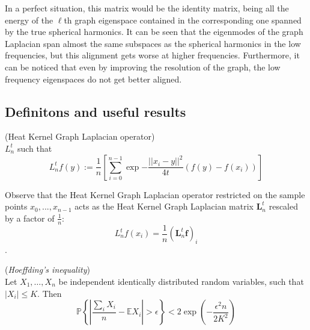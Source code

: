 In a perfect situation, this matrix would be the identity matrix, being all the energy of the $\ell$th graph eigenspace contained in the corresponding one spanned by the true spherical harmonics. It can be seen that the eigenmodes of the graph Laplacian span almost the same subspaces as the spherical harmonics in the low frequencies, but this alignment gets worse at higher frequencies. Furthermore, it can be noticed that even by improving the resolution of the graph, the low frequency eigenspaces do not get better aligned.

\subsection{Definitons and useful results}
\vspace{0.5cm}
\begin{definition}{}(Heat Kernel Graph Laplacian operator)\\
	\label{def:Heat Kernel Graph Laplacian operator}
	$L_n^t$ such that
	$$L_n^tf(y) := \frac{1}{n}\left[ \sum_{i=0}^{n-1} \exp{-\frac{||x_i-y||^2}{4t}}\left(f(y)-f(x_i)\right)\right]$$
\end{definition}
\vspace{0.5cm}
Observe that the Heat Kernel Graph Laplacian operator restricted on the sample points $x_0, ..., x_{n-1}$ acts as the Heat Kernel Graph Laplacian matrix $\mathbf L_n^t$ rescaled by a factor of $\frac{1}{n}$:
$$L_n^tf(x_i) = \frac{1}{n} (\mathbf L_n^t\mathbf f)_i$$.

\vspace{0.5cm}
(\textit{Hoeffding's inequality})\\
Let \(X_{1}, \ldots, X_{n}\) be independent identically distributed random variables, such that
\(\left|X_{i}\right| \leqslant K .\) Then
\begin{equation}\label{eq:Hoeffding}
	\mathbb P\left\{\left|\frac{\sum_{i} X_{i}}{n}-\mathbb{E} X_{i}\right|>\epsilon\right\}<2 \exp \left(-\frac{\epsilon^{2} n}{2 K^{2}}\right)
\end{equation}


